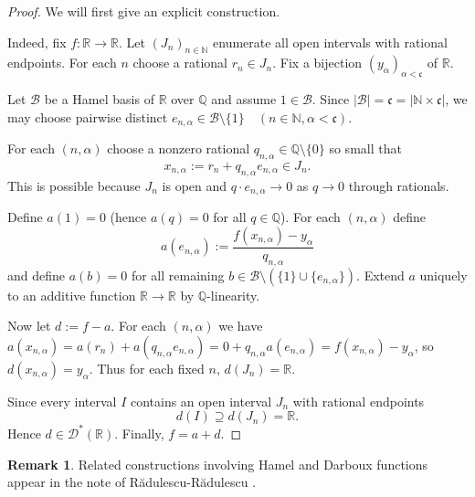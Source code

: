 \documentclass[11pt]{amsart} %
\theoremstyle{definition}
\newtheorem{remark}[theorem]{Remark}
\newcommand{\R}{\mathbb{R}}
\begin{document}
\begin{proof}
We will first give an explicit construction.  

Indeed, fix $f:\mathbb{R}\rightarrow\mathbb{R}$. Let $(J_{n})_{n\in\mathbb{N}}$ enumerate all open intervals with rational endpoints. For each $n$ choose a rational $r_{n}\in J_{n}$. Fix a bijection $(y_{\alpha})_{\alpha<\mathfrak{c}}$ of $\mathbb{R}$.

Let $\mathcal{B}$ be a Hamel basis of $\mathbb{R}$ over $\mathbb{Q}$ and assume $1\in\mathcal{B}$. Since $|\mathcal{B}|=\mathfrak{c}=|\mathbb{N}\times\mathfrak{c}|$, we may choose pairwise distinct
$e_{n,\alpha}\in\mathcal{B}\setminus\{1\} \quad (n\in\mathbb{N},\alpha<\mathfrak{c}).$

For each $(n, \alpha)$ choose a nonzero rational $q_{n,\alpha}\in\mathbb{Q}\setminus\{0\}$ so small that
\begin{equation} 
x_{n,\alpha}:=r_{n}+q_{n,\alpha}e_{n,\alpha}\in J_{n}. 
\end{equation} 
This is possible because $J_{n}$ is open and $q\cdot e_{n,\alpha}\rightarrow0$ as $q\rightarrow0$ through rationals.

Define $a(1)=0$ (hence $a(q)=0$ for all $q\in\mathbb{Q}$). For each $(n, \alpha)$ define
\begin{equation} 
a(e_{n,\alpha}):=\frac{f(x_{n,\alpha})-y_{\alpha}}{q_{n,\alpha}} \end{equation} 
and define $a(b)=0$ for all remaining $b\in\mathcal{B}\setminus(\{1\}\cup\{e_{n,\alpha}\})$. Extend $a$ uniquely to an additive function $\mathbb{R}\rightarrow\mathbb{R}$ by $\mathbb{Q}$-linearity.

Now let $d:=f-a$. For each $(n, \alpha)$ we have
$a(x_{n,\alpha})=a(r_{n})+a(q_{n,\alpha}e_{n,\alpha})=0+q_{n,\alpha}a(e_{n,\alpha})=f(x_{n,\alpha})-y_{\alpha}$, 
so $d(x_{n,\alpha})=y_{\alpha}$. Thus for each fixed $n$, $d(J_{n})=\mathbb{R}. $

Since every interval $I$ contains an open interval $J_n$ with rational endpoints 
\begin{equation} 
d(I)\supseteq d(J_n)=\R. 
\end{equation} 
Hence $d\in \mathcal{D}^{*}(\mathbb{R})$. Finally, $f=a+d$.
\end{proof}

\begin{remark}
\label{rem:8.2}
Related constructions 
involving Hamel and Darboux functions appear in the note of Rădulescu-Rădulescu \cite{16}.
\end{remark}
\end{document}
